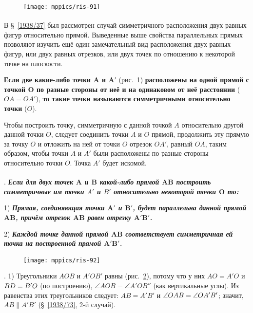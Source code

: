 \begin{figure}
\vskip-15mm
\centering
\texttt{[image: mppics/ris-91]}
\caption{}\label{1938/ris-91}
\end{figure}

\paragraph{}\label{1938/84}
В §~\ref{1938/37} был рассмотрен случай симметричного расположения двух равных фигур относительно прямой.
Выведенные выше свойства параллельных прямых позволяют изучить ещё один замечательный вид расположения двух равных фигур, или двух равных отрезков, или двух точек по отношению к некоторой точке на плоскости.

\textbf{Если две какие-либо точки $\bm{A}$ и $\bm{A'}$} (рис.~\ref{1938/ris-91}) \textbf{расположены на одной прямой с точкой $\bm{O}$ по разные стороны от неё и на одинаковом от неё расстоянии} ($OA=OA'$), \textbf{то такие точки называются симметричными относительно точки} ($O$).

Чтобы построить точку, симметричную с данной точкой $A$ относительно другой данной точки $O$, следует соединить точки $A$ и $O$ прямой, продолжить эту прямую за точку $O$ и отложить на ней от точки $O$ отрезок $OA'$, равный $OA$, таким образом, чтобы точки $A$ и $A'$ были расположены по разные стороны относительно точки $O$.
Точка $A'$ будет искомой.

\paragraph{}\label{1938/85}
.
\textbf{\emph{Если для двух точек $\bm{A}$ и $\bm{B}$ какой-либо прямой $\bm{AB}$ построить симметричные им точки $A'$ и $B'$ относительно некоторой точки $\bm{O}$ то:}}

1) \textbf{\emph{Прямая, соединяющая точки $\bm{A'}$ и $\bm{B'}$, будет параллельна данной прямой $\bm{AB}$, причём отрезок $\bm{AB}$ равен отрезку $\bm{A'B'}$.}}

2) \textbf{\emph{Каждой точке данной прямой $\bm{AB}$ соответствует симметричная ей точка на построенной прямой $\bm{A'B'}$.}}

\begin{figure}
\centering
\texttt{[image: mppics/ris-92]}
\caption{}\label{1938/ris-92}
\end{figure}

\smallskip
\mbox{.}
1) Треугольники $AOB$ и $A'OB'$ равны (рис.~\ref{1938/ris-92}), потому что у них $AO=A'O$ и $BD\z=B'O$ (по построению), $\angle AOB=\angle A'OB''$ (как вертикальные углы).
Из равенства этих треугольников следует:
$AB=A'B'$ и $\angle OAB \z= \angle OA'B'$;
значит, $AB\parallel A'B'$ (§~\ref{1938/73}, 2-й случай).

